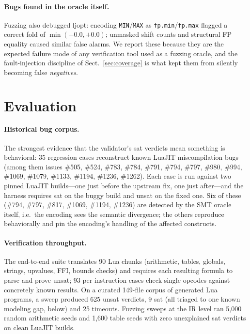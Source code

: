 \documentclass[runningheads]{llncs}
\newif\iffull \fulltrue
\newcommand{\ljopt}{\textsf{ljopt}}
\newcommand{\ir}[1]{\texttt{#1}}
\begin{document}
\iffull
\paragraph{Bugs found in the oracle itself.}
Fuzzing also debugged \ljopt{}: encoding \ir{MIN}/\ir{MAX} as
\texttt{fp.min}/\texttt{fp.max} flagged a correct fold of
$\min(-0.0,+0.0)$; unmasked shift counts and structural FP equality caused
similar false alarms. We report these because they are the expected failure
mode of any verification tool used as a fuzzing oracle, and the
fault-injection discipline of Sect.~\ref{sec:coverage} is what kept them
from silently becoming false \emph{negatives}.
\fi %

\section{Evaluation}\label{sec:eval}

\paragraph{Historical bug corpus.}
The strongest evidence that the validator's \textsf{sat} verdicts mean
something is behavioral: 35 regression cases reconstruct known LuaJIT
miscompilation bugs\iffull{} (among them issues \#505, \#524, \#783,
\#784, \#791,
\#794, \#797, \#980, \#994, \#1069, \#1079, \#1133, \#1194, \#1236,
\#1262)\fi. Each case is run against two pinned LuaJIT builds---one just
before the upstream fix, one just after---and the harness requires
\textsf{sat} on the buggy build and \textsf{unsat} on the fixed one.
Six of these (\#794, \#797, \#817, \#1069, \#1194, \#1236) are detected by
the SMT oracle itself, i.e.\ the encoding sees the semantic divergence; the
others reproduce behaviorally and pin the encoding's handling of the
affected constructs.

\iffull
\paragraph{Verification throughput.}
The end-to-end suite translates 90 Lua chunks (arithmetic, tables, globals,
strings, upvalues, FFI, bounds checks) and requires each resulting formula
to parse and prove \textsf{unsat}; 93 per-instruction cases check single
opcodes against concretely known results. On a curated 149-file corpus of
generated Lua programs, a sweep produced 625 \textsf{unsat} verdicts,
9 \textsf{sat} (all triaged to one known modeling gap, below) and
25 timeouts. Fuzzing sweeps at the IR level ran 5,000 random arithmetic
seeds and 1,600 table seeds with zero unexplained \textsf{sat} verdicts on
clean LuaJIT builds.
\fi
\end{document}
